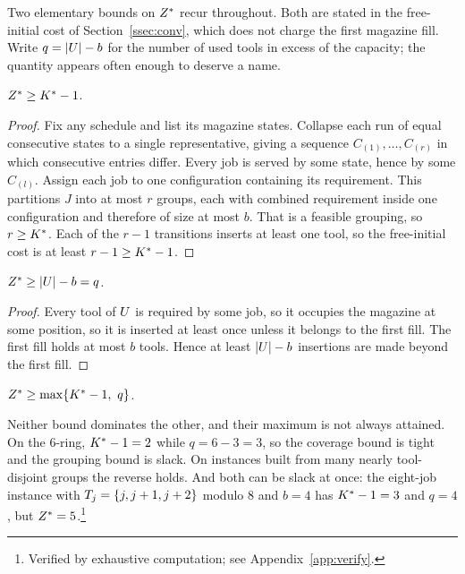 Two elementary bounds on $Z^{\ast}$ recur throughout. Both are stated in the
free-initial cost of Section~\ref{ssec:conv}, which does not charge the first
magazine fill. Write $q=\lvert U\rvert-b$ for the number of used tools in excess of
the capacity; the quantity appears often enough to deserve a name.

\begin{proposition}\label{prop:lb1}
$Z^{\ast}\ge K^{\ast}-1$.
\end{proposition}

\begin{proof}
Fix any schedule and list its magazine states. Collapse each run of equal
consecutive states to a single representative, giving a sequence
$C_{(1)},\dots,C_{(r)}$ in which consecutive entries differ. Every job is served by
some state, hence by some $C_{(l)}$. Assign each job to one configuration containing
its requirement. This partitions $J$ into at most $r$ groups, each with combined
requirement inside one configuration and therefore of size at most $b$. That is a
feasible grouping, so $r\ge K^{\ast}$. Each of the $r-1$ transitions inserts at least one
tool, so the free-initial cost is at least $r-1\ge K^{\ast}-1$.
\end{proof}

\begin{proposition}\label{prop:lb2}
$Z^{\ast}\ge\lvert U\rvert-b=q$.
\end{proposition}

\begin{proof}
Every tool of $U$ is required by some job, so it occupies the magazine at some
position, so it is inserted at least once unless it belongs to the first fill. The
first fill holds at most $b$ tools. Hence at least $\lvert U\rvert-b$ insertions are
made beyond the first fill.
\end{proof}

\begin{corollary}\label{cor:lb}
$Z^{\ast}\ge\max\{K^{\ast}-1,\ q\}$.
\end{corollary}

Neither bound dominates the other, and their maximum is not always attained. On the
$6$-ring, $K^{\ast}-1=2$ while $q=6-3=3$, so the coverage bound is tight and the
grouping bound is slack. On instances built from many nearly tool-disjoint groups
the reverse holds. And both can be slack at once: the eight-job instance with
$T_j=\{j,j+1,j+2\}$ modulo $8$ and $b=4$ has $K^{\ast}-1=3$ and $q=4$, but
$Z^{\ast}=5$.\footnote{Verified by exhaustive computation; see
Appendix~\ref{app:verify}.}

